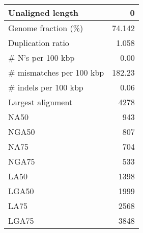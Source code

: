 \documentclass[12pt,a4paper]{article}
\begin{document}
\begin{table}[ht]
\begin{center}
\begin{tabular}{|l*{1}{|r}|}
Unaligned length & 0 \\ \hline
Genome fraction (\%) & 74.142 \\ \hline
Duplication ratio & 1.058 \\ \hline
\# N's per 100 kbp & 0.00 \\ \hline
\# mismatches per 100 kbp & 182.23 \\ \hline
\# indels per 100 kbp & 0.06 \\ \hline
Largest alignment & 4278 \\ \hline
NA50 & 943 \\ \hline
NGA50 & 807 \\ \hline
NA75 & 704 \\ \hline
NGA75 & 533 \\ \hline
LA50 & 1398 \\ \hline
LGA50 & 1999 \\ \hline
LA75 & 2568 \\ \hline
LGA75 & 3848 \\ \hline
\end{tabular}
\end{center}
\end{table}
\end{document}
